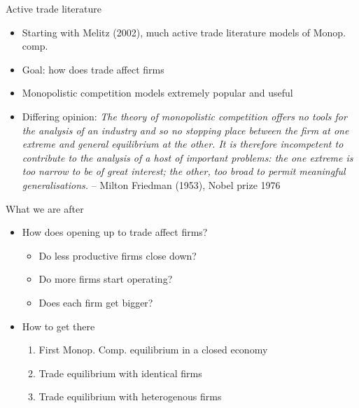 \documentclass[ignorenonframetext,]{beamer}
\begin{document}
\begin{frame}{Active trade literature}

    \begin{itemize}
        \item Starting with Melitz (2002), much active trade literature models of Monop. comp. 
        \item Goal: how does trade affect firms
        \item Monopolistic competition models extremely popular and useful
        \item Differing opinion:
 \emph{The theory of monopolistic competition offers no tools for the analysis of an industry and so no stopping place between the firm at one extreme and general equilibrium at the other. It is therefore incompetent to contribute to the analysis of a host of important problems: the one extreme is too narrow to be of great interest; the other, too broad to permit meaningful generalisations.} -- Milton Friedman (1953), Nobel prize 1976
    \end{itemize}

\end{frame}

\begin{frame}{What we are after}

    \begin{itemize}
        \item How does opening up to trade affect firms?
        \begin{itemize}
            \item Do less productive firms close down?  
            \item Do more firms start operating?
            \item Does each firm get bigger?
        \end{itemize}
        \item How to get there
        \begin{enumerate}
            \item First Monop. Comp. equilibrium in a closed economy
            \item Trade equilibrium with identical firms
            \item Trade equilibrium with heterogenous firms
        \end{enumerate}
    \end{itemize}

\end{frame}
\end{document}
